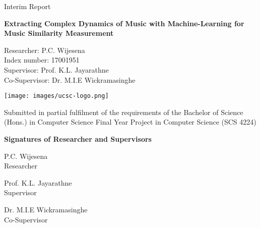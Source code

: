 \documentclass[12pt]{extarticle}
\begin{document}
\begin{titlepage}
    \begin{center}
        
        \Large
        Interim Report
            
        \Huge
        \textbf{Extracting Complex Dynamics of Music with Machine-Learning for Music Similarity Measurement}
            
        \vspace{0.5cm}
        
            
        \vspace{1.5cm}
        \Large
            
        \vfill
        Researcher: P.C. Wijesena\\
        Index number: 17001951\\
        
        \vspace{5mm} %
        Supervisor: Prof. K.L. Jayarathne\\
        
        Co-Supervisor: Dr. M.I.E Wickramasinghe\\
        \normalsize

        \vspace{1.5cm}

        \texttt{[image: images/ucsc-logo.png]}  
       
        Submitted in partial fulfilment of the requirements of the
Bachelor of Science (Hons.) in Computer Science
Final Year Project in Computer Science (SCS 4224)

    \end{center}
\end{titlepage}

\begin{center}
    

\Large
\textbf{Signatures of Researcher and Supervisors}

\vfill

\dotfill

\large
P.C. Wijesena\\
Researcher

\vfill


\dotfill

\large
Prof. K.L. Jayarathne\\
Supervisor

\vfill



\dotfill

\large
Dr. M.I.E Wickramasinghe\\
Co-Supervisor

\end{center}
\end{document}
